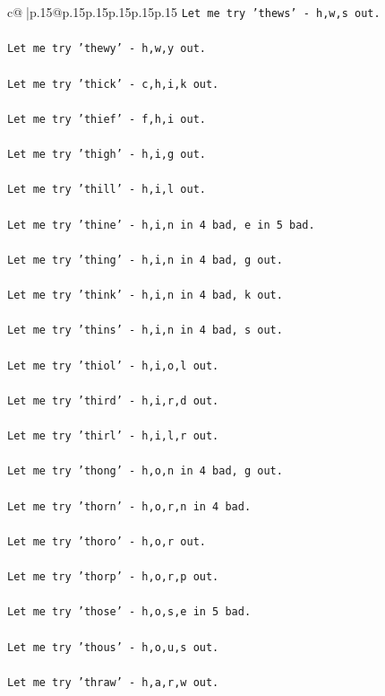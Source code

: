 \documentclass{article}
\begin{document}
{\begin{supertabular}{c@{$\;$}|p{.15\linewidth}@{}p{.15\linewidth}p{.15\linewidth}p{.15\linewidth}p{.15\linewidth}p{.15\linewidth}}
{{{\texttt{Let me try 'thews' {-} h,w,s out. } \\
\\ 
\texttt{Let me try 'thewy' {-} h,w,y out. } \\
\\ 
\texttt{Let me try 'thick' {-} c,h,i,k out. } \\
\\ 
\texttt{Let me try 'thief' {-} f,h,i out. } \\
\\ 
\texttt{Let me try 'thigh' {-} h,i,g out. } \\
\\ 
\texttt{Let me try 'thill' {-} h,i,l out. } \\
\\ 
\texttt{Let me try 'thine' {-} h,i,n in 4 bad, e in 5 bad. } \\
\\ 
\texttt{Let me try 'thing' {-} h,i,n in 4 bad, g out. } \\
\\ 
\texttt{Let me try 'think' {-} h,i,n in 4 bad, k out. } \\
\\ 
\texttt{Let me try 'thins' {-} h,i,n in 4 bad, s out. } \\
\\ 
\texttt{Let me try 'thiol' {-} h,i,o,l out. } \\
\\ 
\texttt{Let me try 'third' {-} h,i,r,d out. } \\
\\ 
\texttt{Let me try 'thirl' {-} h,i,l,r out. } \\
\\ 
\texttt{Let me try 'thong' {-} h,o,n in 4 bad, g out. } \\
\\ 
\texttt{Let me try 'thorn' {-} h,o,r,n in 4 bad. } \\
\\ 
\texttt{Let me try 'thoro' {-} h,o,r out. } \\
\\ 
\texttt{Let me try 'thorp' {-} h,o,r,p out. } \\
\\ 
\texttt{Let me try 'those' {-} h,o,s,e in 5 bad. } \\
\\ 
\texttt{Let me try 'thous' {-} h,o,u,s out. } \\
\\ 
\texttt{Let me try 'thraw' {-} h,a,r,w out. } \\
}}}
\end{supertabular}}
\end{document}

